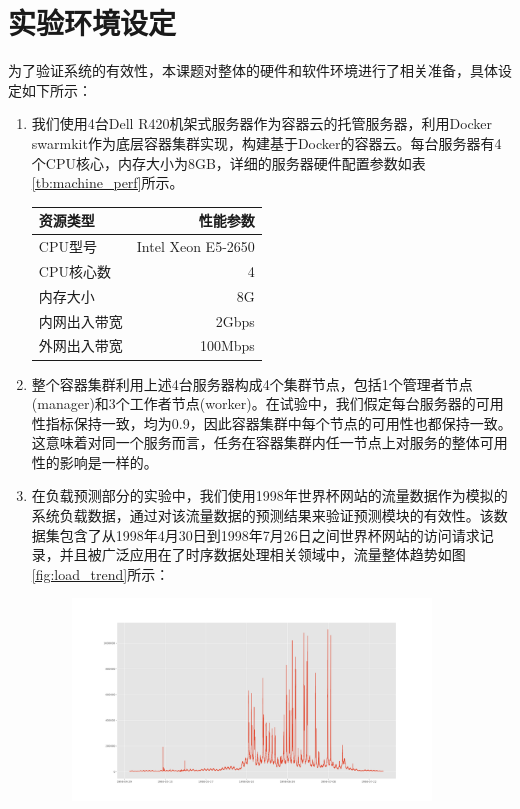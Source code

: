 \section{实验环境设定}\label{sec:env_prep}
为了验证系统的有效性，本课题对整体的硬件和软件环境进行了相关准备，具体设定如下所示：
\begin{enumerate}
\item 我们使用4台Dell R420机架式服务器作为容器云的托管服务器，利用Docker swarmkit作为底层容器集群实现，构建基于Docker的容器云。每台服务器有4个CPU核心，内存大小为8GB，详细的服务器硬件配置参数如表\ref{tb:machine_perf}所示。
\begin{table}[h]
\centering
{}
\begin{tabular}{@{}lr@{}} \toprule
 资源类型 & 性能参数 \\ \midrule
 CPU型号 & Intel Xeon E5-2650\\
 CPU核心数 & 4\\
 内存大小 & 8G\\
 内网出入带宽 & 2Gbps\\
 外网出入带宽 & 100Mbps\\ \bottomrule
\end{tabular}
\end{table}
\item 整个容器集群利用上述4台服务器构成4个集群节点，包括1个管理者节点(manager)和3个工作者节点(worker)。在试验中，我们假定每台服务器的可用性指标保持一致，均为0.9，因此容器集群中每个节点的可用性也都保持一致。这意味着对同一个服务而言，任务在容器集群内任一节点上对服务的整体可用性的影响是一样的。
\item 在负载预测部分的实验中，我们使用1998年世界杯网站的流量数据作为模拟的系统负载数据，通过对该流量数据的预测结果来验证预测模块的有效性。该数据集包含了从1998年4月30日到1998年7月26日之间世界杯网站的访问请求记录，并且被广泛应用在了时序数据处理相关领域中，流量整体趋势如图\ref{fig:load_trend}所示：
\begin{figure}[htbp]
\centering
\includegraphics[width=0.9\textwidth]{./figure/alldata}

\end{figure}
\end{enumerate}
